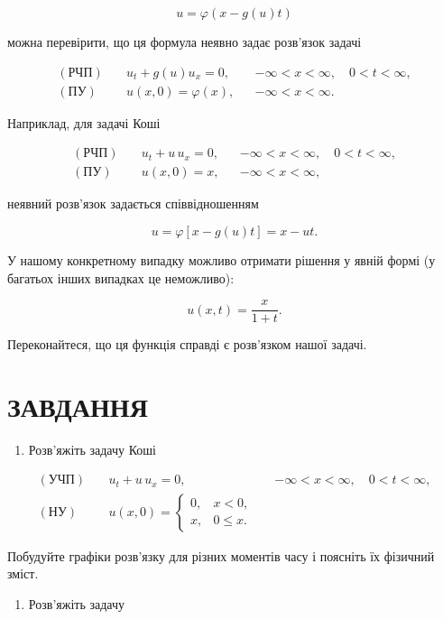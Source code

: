 \documentclass[
  ukrainian,
]{article}
\providecommand{\tightlist}{%
  \setlength{\itemsep}{0pt}\setlength{\parskip}{0pt}}
\begin{document}
\[
u=\varphi(x-g(u)t)
\]

можна перевірити, що ця формула неявно задає розв'язок задачі

\[
\begin{aligned}
(\text{РЧП})\quad & u_t + g(u)u_x = 0, && -\infty < x < \infty,\quad 0 < t < \infty,\\
(\text{ПУ})\quad & u(x,0)=\varphi(x), && -\infty < x < \infty.
\end{aligned}
\]

Наприклад, для задачі Коші

\[
\begin{aligned}
(\text{РЧП})\quad & u_t + u\,u_x = 0, && -\infty < x < \infty,\quad 0 < t < \infty,\\
(\text{ПУ})\quad & u(x,0)=x, && -\infty < x < \infty,
\end{aligned}
\]

неявний розв'язок задається співвідношенням

\[
u=\varphi[x-g(u)t]=x-ut.
\]

У нашому конкретному випадку можливо отримати рішення у явній формі (у
багатьох інших випадках це неможливо):

\[
u(x,t)=\frac{x}{1+t}.
\]

Переконайтеся, що ця функція справді є розв'язком нашої задачі.

\section{ЗАВДАННЯ}\label{ux437ux430ux432ux434ux430ux43dux43dux44f-16}

\begin{enumerate}
\def\labelenumi{\arabic{enumi}.}
\tightlist
\item
  Розв'яжіть задачу Коші
\end{enumerate}

\[
\begin{aligned}
(\text{УЧП})\quad & u_t + u\,u_x = 0, && -\infty < x < \infty,\quad 0 < t < \infty, \\
(\text{НУ})\quad &
u(x,0)=
\begin{cases}
0, & x < 0,\\
x, & 0 \le x.
\end{cases}
\end{aligned}
\]

Побудуйте графіки розв'язку для різних моментів часу і поясніть їх
фізичний зміст.

\begin{enumerate}
\def\labelenumi{\arabic{enumi}.}
\setcounter{enumi}{1}
\tightlist
\item
  Розв'яжіть задачу
\end{enumerate}
\end{document}
